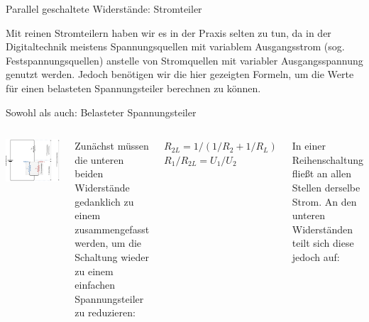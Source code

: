 {\begin{frame}{Parallel geschaltete Widerstände: Stromteiler}
    \bigskip

    \parbox{\linewidth}{
        \footnotesize
        Mit reinen Stromteilern haben wir es in der Praxis selten zu tun, da in der
        Digitaltechnik meistens Spannungsquellen mit variablem Ausgangsstrom (sog.
        Festspannungsquellen) anstelle von Stromquellen mit variabler Ausgangsspannung
        genutzt werden. Jedoch benötigen wir die hier gezeigten Formeln, um die Werte
        für einen belasteten Spannungsteiler berechnen zu können.
    }
\end{frame}
}

{
\small

\begin{frame}{Sowohl als auch: Belasteter Spannungsteiler}
    \begin{columns}
        \includegraphics[width=.9\textwidth]{2-hardwaredesign/img/spannungsteiler_belastet}

        \footnotesize
        \parbox{\textwidth}{
            Zunächst müssen die unteren beiden Widerstände gedanklich zu einem
            zusammengefasst werden, um die Schaltung wieder zu einem einfachen
            Spannungsteiler zu reduzieren:
        }

        \bigskip

        $R_{2L} = 1 / (1/R_2 + 1/R_L)$ \\
        \smallskip
        $R_1 / R_{2L} = U_1 / U_2$ \\

        \bigskip

        \parbox{\textwidth}{
            In einer Reihenschaltung fließt an allen Stellen derselbe Strom. An
            den unteren Widerständen teilt sich diese jedoch auf:
        }


\end{columns}
\end{frame}}
